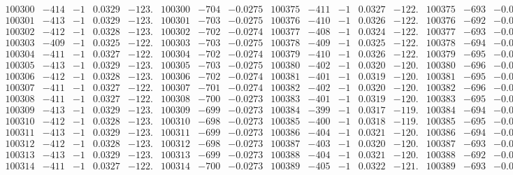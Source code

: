 \documentclass[11pt,reqno,a4letter]{article}
\numberwithin{figure}{section}
\numberwithin{table}{section}
\theoremstyle{plain}
\numberwithin{theorem}{section}
\theoremstyle{definition}
\begin{document}
\begin{table}[ht!]
\begin{equation*}
{\begin{array}{ccccc|ccc||ccccc|ccc}
100300 & -414 & -1 & 0.0329 & -123. & 100300 & -704 & -0.0275 & 100375 & -411 & -1 & 0.0327 & -122. & 100375 & -693 & -0.0270  \\
100301 & -413 & -1 & 0.0329 & -123. & 100301 & -703 & -0.0275 & 100376 & -410 & -1 & 0.0326 & -122. & 100376 & -692 & -0.0270  \\
100302 & -412 & -1 & 0.0328 & -123. & 100302 & -702 & -0.0274 & 100377 & -408 & -1 & 0.0324 & -122. & 100377 & -693 & -0.0270  \\
100303 & -409 & -1 & 0.0325 & -122. & 100303 & -703 & -0.0275 & 100378 & -409 & -1 & 0.0325 & -122. & 100378 & -694 & -0.0271  \\
100304 & -411 & -1 & 0.0327 & -122. & 100304 & -702 & -0.0274 & 100379 & -410 & -1 & 0.0326 & -122. & 100379 & -695 & -0.0271  \\
100305 & -413 & -1 & 0.0329 & -123. & 100305 & -703 & -0.0275 & 100380 & -402 & -1 & 0.0320 & -120. & 100380 & -696 & -0.0272  \\
100306 & -412 & -1 & 0.0328 & -123. & 100306 & -702 & -0.0274 & 100381 & -401 & -1 & 0.0319 & -120. & 100381 & -695 & -0.0271  \\
100307 & -411 & -1 & 0.0327 & -122. & 100307 & -701 & -0.0274 & 100382 & -402 & -1 & 0.0320 & -120. & 100382 & -696 & -0.0272  \\
100308 & -411 & -1 & 0.0327 & -122. & 100308 & -700 & -0.0273 & 100383 & -401 & -1 & 0.0319 & -120. & 100383 & -695 & -0.0271  \\
100309 & -413 & -1 & 0.0329 & -123. & 100309 & -699 & -0.0273 & 100384 & -399 & -1 & 0.0317 & -119. & 100384 & -694 & -0.0271  \\
100310 & -412 & -1 & 0.0328 & -123. & 100310 & -698 & -0.0273 & 100385 & -400 & -1 & 0.0318 & -119. & 100385 & -695 & -0.0271  \\
100311 & -413 & -1 & 0.0329 & -123. & 100311 & -699 & -0.0273 & 100386 & -404 & -1 & 0.0321 & -120. & 100386 & -694 & -0.0271  \\
100312 & -412 & -1 & 0.0328 & -123. & 100312 & -698 & -0.0273 & 100387 & -403 & -1 & 0.0320 & -120. & 100387 & -693 & -0.0270  \\
100313 & -413 & -1 & 0.0329 & -123. & 100313 & -699 & -0.0273 & 100388 & -404 & -1 & 0.0321 & -120. & 100388 & -692 & -0.0270  \\
100314 & -411 & -1 & 0.0327 & -122. & 100314 & -700 & -0.0273 & 100389 & -405 & -1 & 0.0322 & -121. & 100389 & -693 & -0.0270  \\
\end{array}
}
\end{equation*} 

\end{table}
\clearpage 
\end{document}
